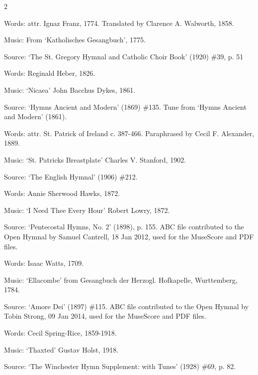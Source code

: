 \begin{multicols}{2}
\par\noindent
Words: attr. Ignaz Franz, 1774. Translated by Clarence A. Walworth, 1858. 
\par\noindent
Music: From `Katholisches Gesangbuch', 1775. 
\par\noindent
Source: `The St. Gregory Hymnal and Catholic Choir Book' (1920) \#39, p. 51


\par\noindent
Words: Reginald Heber, 1826. 
\par\noindent
Music: `Nicaea' John Bacchus Dykes, 1861.
\par\noindent
Source: `Hymns Ancient and Modern' (1869) \#135. Tune from `Hymns Ancient and Modern' (1861).


\par\noindent
Words: attr. St. Patrick of Ireland c. 387-466. Paraphrased by Cecil F. Alexander, 1889. 
\par\noindent
Music: `St. Patricks Breastplate' Charles V. Stanford, 1902.
\par\noindent
Source: `The English Hymnal' (1906) \#212.


\par\noindent
Words: Annie Sherwood Hawks, 1872.
\par\noindent
Music: `I Need Thee Every Hour' Robert Lowry, 1872.
\par\noindent
Source: `Pentecostal Hymns, No. 2' (1898), p. 155. ABC file contributed to the Open Hymnal by Samuel Cantrell, 18 Jan 2012, used for the MuseScore and PDF files.


\par\noindent
Words: Isaac Watts, 1709.
\par\noindent
Music: `Ellacombe' from Gesangbuch der Herzogl. Hofkapelle, Wurttemberg, 1784.
\par\noindent
Source: `Amore Dei' (1897) \#115.  ABC file contributed to the Open Hymnal by Tobin Strong, 09 Jan 2014, used for the MuseScore and PDF files.


\par\noindent
Words: Cecil Spring-Rice, 1859-1918.
\par\noindent
Music: `Thaxted' Gustav Holst, 1918.
\par\noindent
Source: `The Winchester Hymn Supplement: with Tunes' (1928) \#69, p. 82.



\end{multicols}
